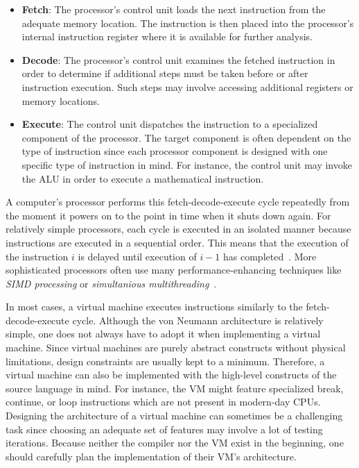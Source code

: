 \begin{itemize}
	\item \textbf{Fetch}: The processor's control unit loads the next instruction from the adequate memory location.
	      The instruction is then placed into the processor's internal instruction register where it is available for further analysis.
	\item \textbf{Decode}:
	      The processor's control unit examines the fetched instruction in order to determine if additional steps must be taken before or after instruction execution.
	      Such steps may involve accessing additional registers or memory locations.
	\item \textbf{Execute}:
	      The control unit dispatches the instruction to a specialized component of the processor.
	      The target component is often dependent on the type of instruction since each processor component is designed with one specific type of instruction in mind.
	      For instance, the control unit may invoke the ALU in order to execute a mathematical instruction.
\end{itemize}

A computer's processor performs this fetch-decode-execute cycle repeatedly from the moment it powers on to the point in time when it shuts down again.
For relatively simple processors, each cycle is executed in an isolated manner because instructions are executed in a sequential order.
This means that the execution of the instruction $i$ is delayed until execution of $i - 1$ has completed~\cite[pp.~208-209]{Ledin2020-yp}.
More sophisticated processors often use many performance-enhancing techniques like \emph{SIMD processing} or \emph{simultanious multithreading}~\cite[pp.~217f.]{Ledin2020-yp}.

In most cases, a virtual machine executes instructions similarly to the fetch-decode-execute cycle.
Although the von Neumann architecture is relatively simple, one does not always have to adopt it when implementing a virtual machine.
Since virtual machines are purely abstract constructs without physical limitations, design constraints are usually kept to a minimum.
Therefore, a virtual machine can also be implemented with the high-level constructs of the source language in mind.
For instance, the VM might feature specialized break, continue, or loop instructions which are not present in modern-day CPUs.
Designing the architecture of a virtual machine can sometimes be a challenging task since choosing an adequate set of features may involve a lot of testing iterations.
Because neither the compiler nor the VM exist in the beginning, one should carefully plan the implementation of their VM's architecture.

